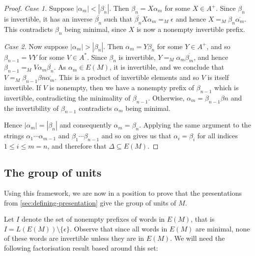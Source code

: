 \documentclass[noindex,noinsetproof,emphthm,12pt]{lmaths}
\begin{document}
\begin{proof}
	\emph{Case 1.} Suppose $|\alpha_m| < |\beta_n|$. Then $\beta_n = X\alpha_m$ for some $X \in A^+$. Since $\beta_n$ is invertible, it has an inverse $\overline{\beta_n}$ such that $\overline{\beta_n}X\alpha_m =_M \epsilon$ and hence $X =_M \beta_n\overline{\alpha_m}$. This contradicts $\beta_n$ being minimal, since $X$ is now a nonempty invertible prefix.

	\emph{Case 2.} Now suppose $|\alpha_m| > |\beta_n|$. Then $\alpha_m = Y\beta_n$ for some $Y \in A^+$, and so $\beta_{n-1} = VY$ for some $V \in A^*$. Since $\beta_n$ is invertible, $Y =_M \alpha_m\overline{\beta_m}$, and hence $\beta_{n-1} =_M V\alpha_m\overline{\beta_n}$. As $\alpha_m \in E(M)$, it is invertible, and we conclude that $V =_M \beta_{n-1}\beta{n}\overline{\alpha_m}$. This is a product of invertible elements and so $V$ is itself invertible. If $V$ is nonempty, then we have a nonempty prefix of $\beta_{n-1}$ which is invertible, contradicting the minimality of $\beta_{n-1}$. Otherwise, $\alpha_m = \beta_{n-1}\beta{n}$ and the invertibility of $\beta_{n-1}$ contradicts $\alpha_m$ being minimal.

	Hence $|\alpha_m| = |\beta_n|$ and consequently $\alpha_m = \beta_n$. Applying the same argument to the strings $\alpha_1 \cdots \alpha_{m-1}$ and $\beta_1 \cdots \beta_{n-1}$ and so on gives us that $\alpha_i = \beta_i$ for all indices $1 \le i \le m = n$, and therefore that $\Delta \subseteq E(M)$.
\end{proof}


\subsection{The group of units} \label{sec:group-of-units}

Using this framework, we are now in a position to prove that the presentations from \cref{sec:defining-presentation} give the group of units of $M$.

Let $I$ denote the set of nonempty prefixes of words in $E(M)$, that is $I = L(E(M)) \setminus \{\epsilon\}$. Observe that since all words in $E(M)$ are minimal, none of these words are invertible unless they are in $E(M)$. We will need the following factorisation result based around this set:
\end{document}

